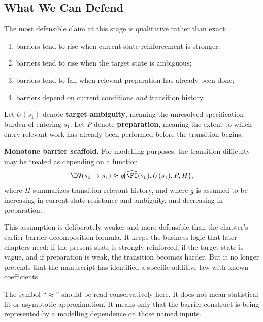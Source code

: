 \subsection{What We Can Defend}

The most defensible claim at this stage is qualitative rather than exact:
\begin{enumerate}[nosep]
  \item barriers tend to rise when current-state reinforcement is stronger;
  \item barriers tend to rise when the target state is ambiguous;
  \item barriers tend to fall when relevant preparation has already been done;
  \item barriers depend on current conditions \emph{and} transition history.
\end{enumerate}

\begin{definition}
Let $U(s_1)$ denote \textbf{target ambiguity}, meaning the unresolved
specification burden of entering $s_1$. Let $P$ denote \textbf{preparation},
meaning the extent to which entry-relevant work has already been performed
before the transition begins.
\end{definition}

\begin{remark}
\textbf{Monotone barrier scaffold.}
For modelling purposes, the transition difficulty may be treated as depending
on a function
\[
  \DV(s_0 \to s_1) \approx g\!\bigl(\widehat{\FI}(s_0), U(s_1), P, H\bigr),
\]
where $H$ summarizes transition-relevant history, and where $g$ is assumed to
be increasing in current-state resistance and ambiguity, and decreasing in
preparation.
\end{remark}

\begin{discussion}
This assumption is deliberately weaker and more defensible than the chapter's
earlier barrier-decomposition formula. It keeps the business logic that later
chapters need: if the present state is strongly reinforced, if the target state
is vague, and if preparation is weak, the transition becomes harder. But it no
longer pretends that the manuscript has identified a specific additive law with
known coefficients.
\end{discussion}

\begin{remark}
The symbol ``$\approx$'' should be read conservatively here. It does not mean
statistical fit or asymptotic approximation. It means only that the barrier
construct is being represented by a modelling dependence on those named inputs.
\end{remark}
